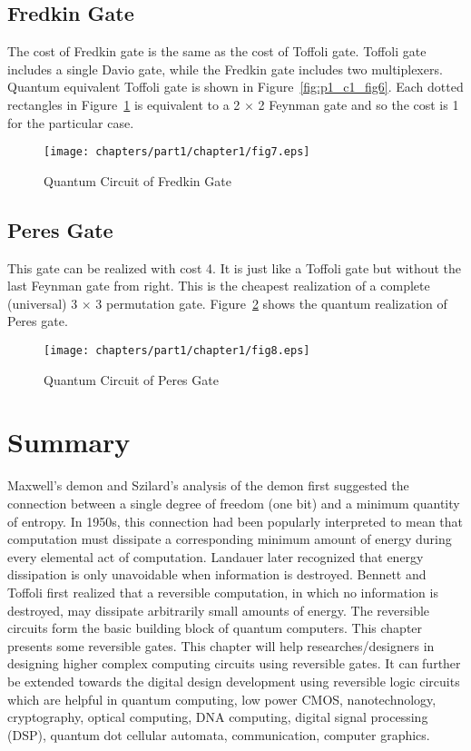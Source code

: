 \subsection{Fredkin Gate}
The cost of Fredkin gate is the same as the cost of Toffoli gate. Toffoli gate includes a single Davio gate, while the Fredkin gate includes two multiplexers. Quantum equivalent Toffoli gate is shown in Figure~\ref{fig:p1_c1_fig6}. Each dotted rectangles in Figure~\ref{fig:p1_c1_fig7} is equivalent to a 2 $\times$ 2 Feynman gate and so the cost is 1 for the particular case.

	\begin{figure}[h]
	\centering
	\texttt{[image: chapters/part1/chapter1/fig7.eps]}
	\caption{Quantum Circuit of Fredkin Gate}
	\label{fig:p1_c1_fig7}
\end{figure}

\subsection{Peres Gate}
	This gate can be realized with cost 4. It is just like a Toffoli gate but without the last Feynman gate from right. This is the cheapest realization of a complete (universal) 3 $\times$ 3 permutation gate. Figure~\ref{fig:p1_c1_fig8} shows the quantum realization of Peres gate.
	\\
	\begin{figure}[h]
		\centering
		\texttt{[image: chapters/part1/chapter1/fig8.eps]}
		\caption{Quantum Circuit of Peres Gate}
		\label{fig:p1_c1_fig8}
	\end{figure}

\section{Summary}
Maxwell's demon and Szilard's analysis of the demon first suggested the connection between a single degree of freedom (one bit) and a minimum quantity of entropy. In 1950s, this connection had been popularly interpreted to mean that computation must dissipate a corresponding minimum amount of energy during every elemental act of computation. Landauer later recognized that energy dissipation is only unavoidable when information is destroyed. Bennett and Toffoli first realized that a reversible computation, in which no information is destroyed, may dissipate arbitrarily small amounts of energy. The reversible circuits form the basic building block of quantum computers. This chapter presents some reversible gates. This chapter will help researches/designers in designing higher complex computing circuits using reversible gates. It can further be extended towards the digital design  development using reversible logic circuits which are helpful in quantum computing, low power CMOS, nanotechnology, cryptography, optical computing, DNA computing, digital signal processing (DSP), quantum dot cellular automata, communication, computer graphics.

